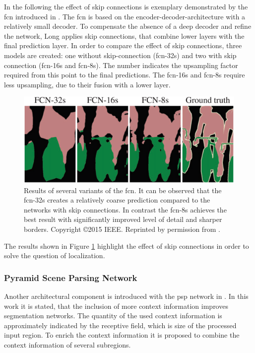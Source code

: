 In the following the effect of skip connections is exemplary demonstrated by the \gls{fcn} introduced in \cite{LSD15-FCN}.
The \gls{fcn} is based on the encoder-decoder-architecture with a relatively small decoder.
To compensate the absence of a deep decoder and refine the network, Long applies skip connections, that combine lower layers with the final prediction layer.
In order to compare the effect of skip connections, three models are created: one without skip-connection (\gls{fcn}-32s) and two with skip connection (\gls{fcn}-16s and \gls{fcn}-8s).
The number indicates the upsampling factor required from this point to the final predictions.
The \gls{fcn}-16s and \gls{fcn}-8s require less upsampling, due to their fusion with a lower layer.
\begin{figure}
	\includegraphics[width=\linewidth]{figures/chap223_fcn_results.png}	
	\caption[FCN Predictions]{
		Results of several variants of the \gls{fcn}. 
		It can be observed that the \gls{fcn}-32s creates a relatively coarse prediction compared to the networks with skip connections.
		In contrast the \gls{fcn}-8s achieves the best result with significantly improved level of detail and sharper borders.
		Copyright \copyright 2015 IEEE. Reprinted by permission from \cite{LSD15-FCN}.}
	\label{fig:ch2:sec2:fcn_res}
\end{figure}
The results shown in Figure \ref{fig:ch2:sec2:fcn_res} highlight the effect of skip connections in order to solve the question of localization.

\subsubsection{Pyramid Scene Parsing Network}

Another architectural component is introduced with the \gls{psp} network in \cite{Zhao17-PSP}.
In this work it is stated, that the inclusion of more context information improves segmentation networks.
The quantity of the used context information is approximately indicated by the receptive field, which is size of the processed input region.
To enrich the context information it is proposed to combine the context information of several subregions.

